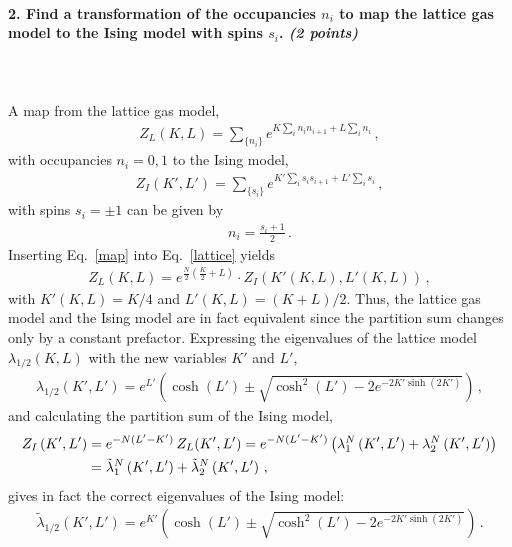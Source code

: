 \paragraph{2. Find a transformation of the 
    occupancies $n_i$ to map the lattice gas 
    model to the Ising model with spins $s_i$. 
    \textit{(2 points)}
} \ \\
\\
A map from the lattice gas model,
\begin{align}
	\label{lattice}
	Z_L(K,L) = \sum_{\{n_i\}} 
	e^{K\sum_i n_i n_{i+1}+L \sum_i n_i} \,,
\end{align}
with occupancies $n_i=0,1$ to the Ising model,
\begin{align}
	\label{ising}
	Z_I(K',L') = \sum_{\{s_i\}} 
	e^{K'\sum_i s_i s_{i+1}+L' \sum_i s_i} \,,
\end{align}
with spins $s_i=\pm 1$ can be given by
\begin{align}
	\label{map}
	n_i = \frac{s_i + 1}{2} \,.
\end{align}
Inserting Eq.~\eqref{map} into Eq.~\eqref{lattice} yields
\begin{align}
	Z_L(K,L) = e^{\frac{N}{2}(\frac{K}{2} + L)} \cdot
	Z_I\left(K'(K,L),L'(K,L)\right) \,,
\end{align}
with $K'(K,L) = K/4$ and $L'(K,L)=(K+L)/2$. Thus, 
the lattice gas model and the Ising model are in fact 
equivalent since the partition sum changes only by a 
constant prefactor. Expressing the eigenvalues of the lattice 
model $\lambda_{1/2}(K,L)$ with the new variables 
$K'$ and $L'$, 
\begin{align}
	\lambda_{1/2}\left(K',L'\right) = 
	e^{L'}\left(\cosh(L')\pm\sqrt{\cosh^2(L')-2e^{-2K'\sinh(2K')}}\right) \,,
\end{align}
and calculating the partition sum of the Ising model,
\begin{align}
	Z_I\left(K',L'\right) &= e^{-N(L'-K')} \, Z_L(K',L') 
	= e^{-N(L'-K')} \left(\lambda_1^N\left(K',L'\right)+\lambda_2^N\left(K',L'\right)\right) \notag \\
	&= \tilde{\lambda}_1^N\left(K',L'\right) + \tilde{\lambda}_2^N\left(K',L'\right) \,,
\end{align}
gives in fact the correct eigenvalues of the Ising model:
\begin{align}
	\tilde{\lambda}_{1/2}\left(K',L'\right) = 
	e^{K'}\left(\cosh(L')\pm\sqrt{\cosh^2(L')-2e^{-2K'\sinh(2K')}}\right) \,.
\end{align}



